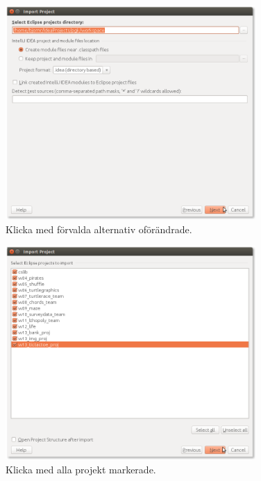 \begin{figure}
\centering
\includegraphics[width=0.85\textwidth]{../img/intellij/idea-import4-directory.png}
\caption{Klicka  med förvalda alternativ oförändrade.}
\label{fig:idea:import4-directory}
\end{figure}

\begin{figure}
\centering
\includegraphics[width=0.85\textwidth]{../img/intellij/idea-import5-select-projects.png}
\caption{Klicka  med alla projekt markerade.}
\label{fig:idea:import5-select-projects}
\end{figure}

